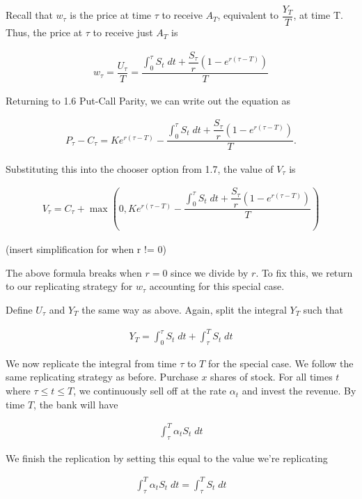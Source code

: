 \documentclass[reqno]{amsart}
\begin{document}
Recall that $w_\tau$ is the price at time $\tau$ to receive $A_T$, equivalent to $\dfrac{Y_T}{T}$, at time T.
Thus, the price at $\tau$ to receive just $A_T$ is 

\begin{align}
     w_\tau = \dfrac{U_\tau}{T} = \dfrac{\int_0^\tau S_t \; dt + \dfrac{S_\tau}{r}\left( 1 - e^{r(\tau - T)} \right)}{T}
\end{align}

Returning to 1.6 Put-Call Parity, we can write out the equation as

\begin{align}
     P_\tau - C_\tau = Ke^{r(\tau - T)} - \dfrac{\int_0^\tau S_t \; dt + \dfrac{S_\tau}{r}\left( 1 - e^{r(\tau - T)} \right)}{T}.
\end{align}

Substituting this into the chooser option from 1.7, the value of $V_\tau$ is

\begin{align}
     V_\tau = C_\tau + \max(0, Ke^{r(\tau - T)} - \dfrac{\int_0^\tau S_t \; dt + \dfrac{S_\tau}{r}\left( 1 - e^{r(\tau - T)} \right)}{T})
\end{align}

(insert simplification for when r != 0)

The above formula breaks when $r = 0$ since we divide by $r$. To fix this, we return to our replicating strategy for $w_\tau$ accounting for this special case.

Define $U_\tau$ and $Y_T$ the same way as above. Again, split the integral $Y_T$ such that

\begin{align}
     Y_T = \int_0^\tau S_t \; dt + \int_\tau^T S_t \; dt
\end{align}

We now replicate the integral from time $\tau$ to $T$ for the special case. We follow the same replicating strategy as before. Purchase $x$ shares of stock. For all times $t$ where $\tau \leq t \leq T$, we continuously sell off at the rate $\alpha_t$ and invest the revenue. 
By time $T$, the bank will have 

\begin{align}
     \int_\tau^T \alpha_t S_t \; dt
\end{align}

We finish the replication by setting this equal to the value we're replicating

\begin{align}
     \int_\tau^T \alpha_t S_t \; dt = \int_\tau^T S_t \; dt
\end{align}
\end{document}

